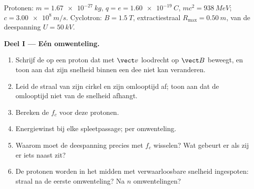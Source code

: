 \begin{problem}
\label{pb:b1:charged-particles:1}
Protonen: $m = \qty{1.67e-27}{kg}$, $q = e = \qty{1.60e-19}{C}$, $mc^2 =
\qty{938}{MeV}$; $c = \qty{3.00e8}{m/s}$. Cyclotron: $B = \qty{1.5}{T}$,
extractiestraal $R_{\max} = \qty{0.50}{m}$,  van de deespanning
$U = \qty{50}{kV}$.

\medskip
\noindent\textbf{Deel I --- Eén omwenteling.}
\begin{enumerate}
  \item Schrijf de  op een proton dat met $\vect v$
        loodrecht op $\vect B$ beweegt, en toon aan dat zijn snelheid binnen
        een dee niet kan veranderen.
  \item Leid de straal van zijn cirkel en zijn omlooptijd af; toon aan dat de
        omlooptijd niet van de snelheid afhangt.
  \item Bereken de  $f_c$ voor deze protonen.
  \item Energiewinst bij elke spleetpassage; per omwenteling.
  \item Waarom moet de deespanning precies met $f_c$ wisselen? Wat gebeurt er
        als zij er iets naast zit?
  \item De protonen worden in het midden met verwaarloosbare snelheid ingespoten:
        straal na de eerste omwenteling? Na $n$ omwentelingen?
\end{enumerate}


\end{problem}
